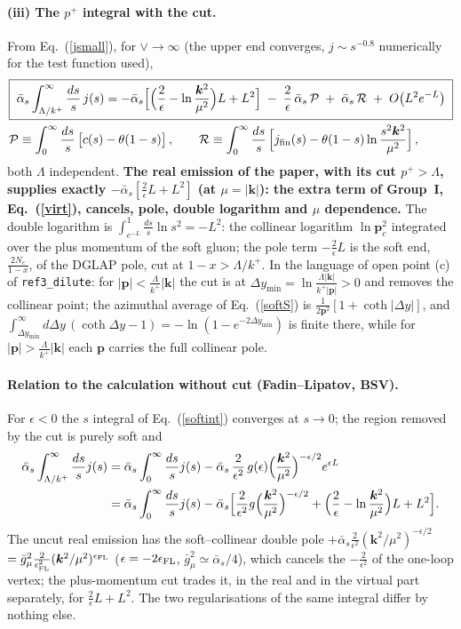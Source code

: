 \documentclass[11pt,a4paper]{article}
\renewcommand{\v}[1]{\bm{#1}}
\newcommand{\ab}{\bar\alpha_s}
\begin{document}
\paragraph{(iii) The $p^+$ integral with the cut.} From Eq.~(\ref{jsmall}), for $\vee\to\infty$ (the upper end converges, $j\sim s^{-0.8}$ numerically for the test function used),
\begin{align}
&\boxed{\;\ab\int_{\Lambda/k^+}^{\infty}\frac{ds}{s}\,j(s)=-\ab\Big[\Big(\frac2\epsilon-\ln\frac{\v k^2}{\mu^2}\Big)L+L^2\Big]\;-\;\frac2\epsilon\,\ab\,\mathcal P\;+\;\ab\,\mathcal R\;+\;O\big(L^2e^{-L}\big)\;}\label{task1}\\
&\mathcal P\equiv\int_0^\infty\frac{ds}{s}\,\big[c(s)-\theta(1-s)\big]\,,\qquad
\mathcal R\equiv\int_0^\infty\frac{ds}{s}\,\Big[j_{\rm fin}(s)-\theta(1-s)\ln\frac{s^2\v k^2}{\mu^2}\Big]\,,\notag
\end{align}
both $\Lambda$ independent. \textbf{The real emission of the paper, with its cut $p^+>\Lambda$, supplies exactly $-\ab[\frac2\epsilon L+L^2]$ (at $\mu=|\v k|$): the extra term of Group~I, Eq.~(\ref{virt}), cancels, pole, double logarithm and $\mu$ dependence.} The double logarithm is $\int_{e^{-L}}^1\frac{ds}{s}\ln s^2=-L^2$: the collinear logarithm $\ln\v p_c^2$ integrated over the plus momentum of the soft gluon; the pole term $-\frac2\epsilon L$ is the soft end, $\frac{2N_c}{1-x}$, of the DGLAP pole, cut at $1-x>\Lambda/k^+$. In the language of open point (c) of \texttt{ref3\_dilute}: for $|\v p|<\frac{\Lambda}{k^+}|\v k|$ the cut is at $\Delta y_{\min}=\ln\frac{\Lambda|\v k|}{k^+|\v p|}>0$ and removes the collinear point; the azimuthal average of Eq.~(\ref{softS}) is $\frac{1}{2\v p^2}[1+\coth|\Delta y|]$, and $\int_{\Delta y_{\min}}^\infty d\Delta y\,(\coth\Delta y-1)=-\ln(1-e^{-2\Delta y_{\min}})$ is finite there, while for $|\v p|>\frac{\Lambda}{k^+}|\v k|$ each $\v p$ carries the full collinear pole.

\paragraph{Relation to the calculation without cut (Fadin--Lipatov, BSV).} For $\epsilon<0$ the $s$ integral of Eq.~(\ref{softint}) converges at $s\to0$; the region removed by the cut is purely soft and
\begin{align}
\ab\int_{\Lambda/k^+}^{\infty}\frac{ds}{s}j(s)&=\ab\int_0^\infty\frac{ds}{s}j(s)-\ab\,\frac{2}{\epsilon^2}\,g(\epsilon)\Big(\frac{\v k^2}{\mu^2}\Big)^{-\epsilon/2}e^{\epsilon L}\notag\\
&=\ab\int_0^\infty\frac{ds}{s}j(s)-\ab\Big[\frac{2}{\epsilon^2}g\Big(\frac{\v k^2}{\mu^2}\Big)^{-\epsilon/2}+\Big(\frac2\epsilon-\ln\frac{\v k^2}{\mu^2}\Big)L+L^2\Big].\label{nocut}
\end{align}
The uncut real emission has the soft--collinear double pole $+\ab\frac{2}{\epsilon^2}(\v k^2/\mu^2)^{-\epsilon/2}$ $=\bar g_\mu^2\frac{2}{\epsilon_{\rm FL}^2}(\v k^2/\mu^2)^{\epsilon_{\rm FL}}$ ($\epsilon=-2\epsilon_{\rm FL}$, $\bar g^2_\mu\simeq\ab/4$), which cancels the $-\frac{2}{\epsilon^2}$ of the one-loop vertex; the plus-momentum cut trades it, in the real and in the virtual part separately, for $\frac2\epsilon L+L^2$. The two regularisations of the same integral differ by nothing else.
\end{document}
